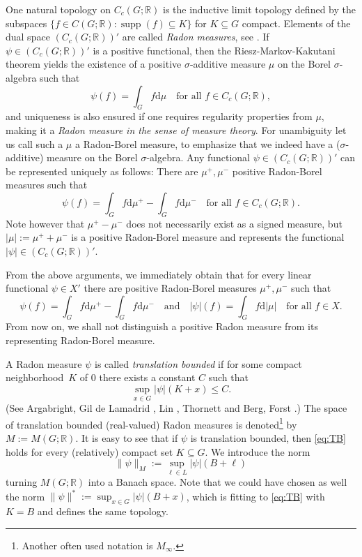 \documentclass[[a4paper,english,12pt]{amsart}
\theoremstyle{plain}
\newtheorem{definition}[theorem]{Definition}
\theoremstyle{remark}
\newcommand\supp{\operatorname{supp}}
\newcommand{\RR}{\mathbb R}
\def\dd{\mathrm{d}}
\newcommand{\si}{\sigma}
\begin{document}
One natural topology on $C_c(G;\RR)$ is the inductive limit topology defined by the subspaces $\{f\in C(G;\RR):\supp(f)\subseteq K\}$ for  $K\subseteq G$ compact. Elements of the dual space $(C_c(G;\RR))'$ are called \emph{Radon measures}, see \cite{AG-Memoirs}. If $\psi \in(C_c(G;\RR))'$ is a positive functional, then the Riesz-Markov-Kakutani theorem yields the existence  of a positive $\si$-additive measure $\mu$ on the Borel $\sigma$-algebra such that
\[
\psi(f)=\int_Gf\dd\mu\quad\text{for all $f\in C_c(G;\RR)$},
\]
and uniqueness is also ensured if one requires regularity properties from $\mu$, making it a \emph{Radon measure in the sense of measure theory}. For unambiguity let us call such a $\mu$ a Radon-Borel measure, to emphasize that we indeed have a ($\si$-additive) measure on the Borel $\si$-algebra. Any functional  $\psi \in(C_c(G;\RR))'$ can be represented uniquely as follows: There are $\mu^+,\mu^-$ positive Radon-Borel measures such that
\[
\psi(f)=\int_Gf\dd\mu^+-\int_Gf\dd\mu^-\quad\text{for all $f\in C_c(G;\RR)$}.
\]
Note however that $\mu^+-\mu^-$ does not necessarily exist as a signed measure, but $|\mu|:=\mu^++\mu^-$ is  a positive Radon-Borel measure and represents the functional $|\psi|\in (C_c(G;\RR))'$.


 \medskip From the above arguments, we immediately obtain that for every linear functional $\psi\in X'$ there are positive Radon-Borel measures  $\mu^+,\mu^-$ such that
\[
\psi(f)=\int_Gf\dd\mu^+-\int_Gf\dd\mu^-\quad\text{and}\quad |\psi|(f)=\int_Gf\dd|\mu|\quad \text{for all $f\in X$}.
\]
From now on, we shall not distinguish a positive Radon measure from its representing Radon-Borel measure.




	A Radon measure $\psi$ is called \emph{translation bounded} if for some  compact neighborhood~$K$ of $0$ there exists a  constant $C$ such that
	\begin{equation}\label{eq:TB}
	\sup_{x\in G}|\psi|(K+x)\le C.
	\end{equation}
(See  Argabright, Gil de Lamadrid \cite{AG-Memoirs}, Lin \cite{Lin}, Thornett \cite{Thornett} and Berg, Forst \cite{BergForst}.)
The space of translation bounded (real-valued) Radon measures is denoted\footnote{Another often used notation is $M_\infty$.} by $M:=M(G;\RR)$.
It is easy to see that if $\psi$ is translation bounded, then \eqref{eq:TB} holds for every (relatively)  compact set $K\subseteq G$.
We introduce the norm
\[
\|\psi\|_M:=\sup_{\ell \in L} |\psi|(B+\ell)
\]
turning $M(G;\RR)$ into a Banach space. Note that we could have chosen as well the norm $\|\psi\|^* := \sup_{x\in G} |\psi|(B+x)$, which is fitting to \eqref{eq:TB} with $K=B$ and defines the same topology.
\end{document}

